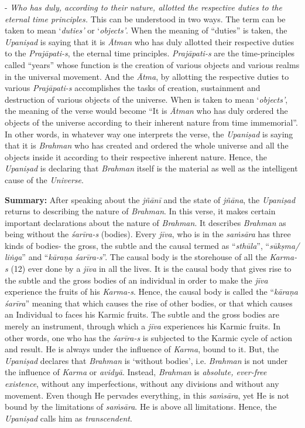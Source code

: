 - \emph{Who has duly, according to their nature, allotted the respective duties to the eternal time principles.} This can be understood in two ways. The term  can be taken to mean `\emph{duties'} or `\emph{objects'}. When the meaning of ``duties'' is taken, the \emph{Upaniṣad} is saying that it is \emph{Ātman} who has duly allotted their respective duties to the \emph{Prajāpati-s}, the eternal time principles. \emph{Prajāpati-s} are the time-principles called ``years'' whose function is the creation of various objects and various realms in the universal movement. And the \emph{Ātma}, by allotting the respective duties to various \emph{Prajāpati-s} accomplishes the tasks of creation, sustainment and destruction of various objects of the universe. When  is taken to mean `\emph{objects'}, the meaning of the verse would become ``It is \emph{Ātman} who has duly ordered the objects of the universe according to their inherent nature from time immemorial''. In other words, in whatever way one interprets the verse, the \emph{Upaniṣad} is saying that it is \emph{Brahman} who has created and ordered the whole universe and all the objects inside it according to their respective inherent nature. Hence, the \emph{Upaniṣad} is declaring that \emph{Brahman} itself is the material as well as the intelligent cause of the \emph{Universe}.

\textbf{Summary:} After speaking about the \emph{jñānī} and the state of \emph{jñāna}, the \emph{Upaniṣad} returns to describing the nature of \emph{Brahman}. In this verse, it makes certain important declarations about the nature of \emph{Brahman}. It describes \emph{Brahman} as being without the \emph{śarīra-s} (bodies). Every \emph{jīva}, who is in the \emph{saṁsāra} has three kinds of bodies- the gross, the subtle and the causal termed as ``\emph{sthūla}'', ``\emph{sūkṣma/ liṅga}'' and ``\emph{kāraṇa śarīra-s}''. The causal body is the storehouse of all the \emph{Karma-s} (12) ever done by a \emph{jīva} in all the lives. It is the causal body that gives rise to the subtle and the gross bodies of an individual in order to make the \emph{jīva} experience the fruits of his \emph{Karma-s}. Hence, the causal body is called the ``\emph{kāraṇa śarīra}'' meaning that which causes the rise of other bodies, or that which causes an Individual to faces his Karmic fruits. The subtle and the gross bodies are merely an instrument, through which a \emph{jīva} experiences his Karmic fruits. In other words, one who has the \emph{śarīra-s} is subjected to the Karmic cycle of action and result. He is always under the influence of \emph{Karma}, bound to it. But, the \emph{Upaniṣad} declares that \emph{Brahman} is `without bodies', i.e. \emph{Brahman} is not under the influence of \emph{Karma} or \emph{avidyā}. Instead, \emph{Brahman} is \emph{absolute, ever-free existence}, without any imperfections, without any divisions and without any movement. Even though He pervades everything, in this \emph{saṁsāra}, yet He is not bound by the limitations of \emph{saṁsāra}. He is above all limitations. Hence, the \emph{Upaniṣad} calls him as \emph{transcendent}.

